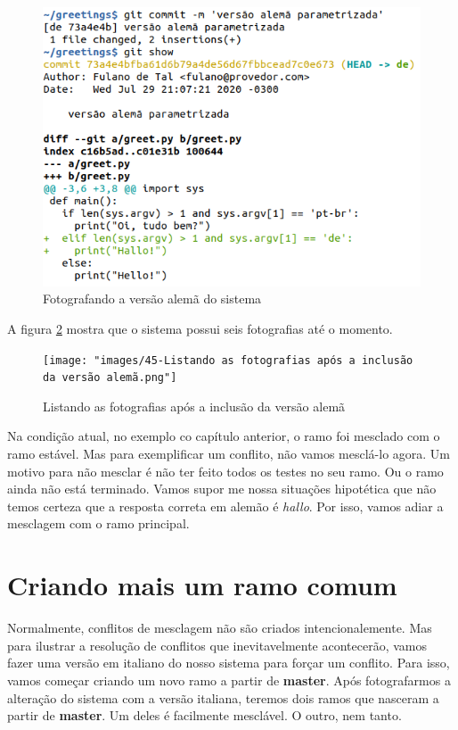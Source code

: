 \documentclass[a4paper]{book}
\begin{document}
\begin{figure}[ht]
\caption{Fotografando a versão alemã do sistema}
\label{fig:44}
\centering
\includegraphics[scale=0.6,left]{"images/44-Fotografando a versão alemã do sistema.png"}
\end{figure}

A figura \ref{fig:45} mostra que o sistema possui seis 
fotografias até o momento.

\begin{figure}[!h]
\caption{Listando as fotografias após a inclusão da versão alemã}
\label{fig:45}
\centering
\texttt{[image: "images/45-Listando as fotografias após a inclusão da versão alemã.png"]}
\end{figure}

Na condição atual, no exemplo co capítulo anterior,
o ramo foi mesclado com o ramo estável.
Mas para exemplificar um conflito, não vamos mesclá-lo 
agora.
Um motivo para não mesclar é não ter feito todos os
testes no seu ramo.
Ou o ramo ainda não está terminado.
Vamos supor me nossa situações hipotética que 
não temos certeza que a resposta correta em alemão
é \textit{hallo}.
Por isso, vamos adiar a mesclagem com o ramo principal.

\newpage
\section{Criando mais um ramo comum}

Normalmente, conflitos de mesclagem não são criados 
intencionalemente. Mas para ilustrar a resolução 
de conflitos que inevitavelmente acontecerão,
vamos fazer uma versão em italiano do nosso 
sistema para forçar um conflito.
Para isso, vamos começar criando um novo ramo a
partir de \textbf{master}.
Após fotografarmos a alteração do sistema
com a versão italiana, teremos dois ramos que
nasceram a partir de \textbf{master}.
Um deles é facilmente mesclável. O outro, nem tanto.
\end{document}
